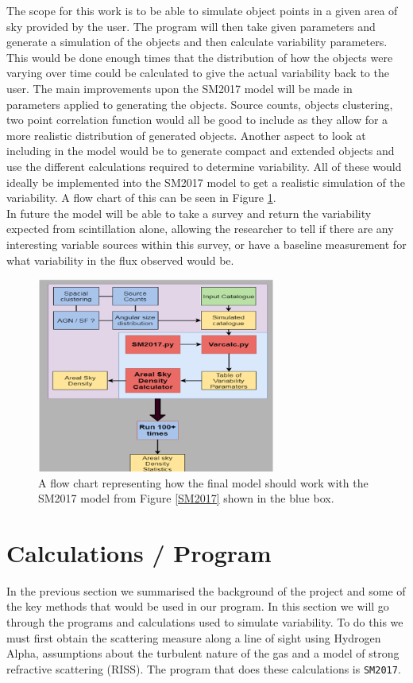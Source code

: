 \documentclass[a4paper, 10pt]{article}
\begin{document}
The scope for this work is to be able to simulate object points in a given area of sky provided by the user. The program will then take given parameters and generate a simulation of the objects and then calculate variability parameters. This would be done enough times that the distribution of how the objects were varying over time could be calculated to give the actual variability back to the user. The main improvements upon the SM2017 model will be made in parameters applied to generating the objects. Source counts, objects clustering, two point correlation function would all be good to include as they allow for a more realistic distribution of generated objects. Another aspect to look at including in the model would be to generate compact and extended objects and use the different calculations required to determine variability. All of these would ideally be implemented into the SM2017 model to get a realistic simulation of the variability. A flow chart of this can be seen in Figure \ref{VarSim}.\\

In future the model will be able to take a survey and return the variability expected from scintillation alone, allowing the researcher to tell if there are any interesting variable sources within this survey, or have a baseline measurement for what variability in the flux observed would be.
\begin{figure}[H]
\begin{center}
	\includegraphics[width=0.7\textwidth]{VarSim}
	\caption{A flow chart representing how the final model should work with the SM2017 model from Figure \ref{SM2017} shown in the blue box.}
	\label{VarSim}
\end{center}
\end{figure}
\section{Calculations / Program}
In the previous section we summarised the background of the project and some of the key methods that would be used in our program. In this section we will go through the programs and calculations used to simulate variability. To do this we must first obtain the scattering measure along a line of sight using Hydrogen Alpha, assumptions about the turbulent nature of the gas and a model of strong refractive scattering (RISS). The program that does these calculations is \texttt{SM2017}.
\end{document}
